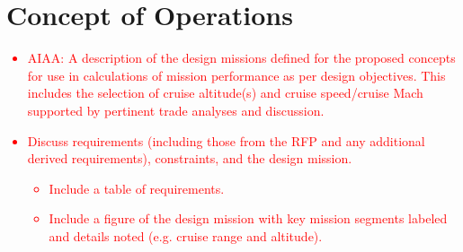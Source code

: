 \documentclass[conf]{new-aiaa}
\begin{document}
\section{Concept of Operations}
\textcolor{red}{
\begin{itemize}
    \item AIAA: A description of the design missions defined for the proposed concepts for use in
calculations of mission performance as per design objectives. This includes the
selection of cruise altitude(s) and cruise speed/cruise Mach supported by pertinent
trade analyses and discussion.
    \item Discuss requirements (including those from the RFP and any additional derived requirements), constraints, and the design mission.
    \begin{itemize}
        \item Include a table of requirements.
        \item Include a figure of the design mission with key mission segments labeled and details noted (e.g. cruise range and altitude).
    \end{itemize}
\end{itemize}}
\end{document}
